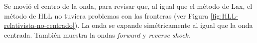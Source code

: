 \documentclass[12pt,a4paper]{book}
\begin{document}
Se movió el centro de la onda, para revisar que, al igual que el método de Lax, el método de HLL no tuviera problemas con las fronteras (ver Figura \ref{fig:HLL-relativista-no-centrado}). La onda se expande simétricamente al igual que la onda centrada. También muestra la ondas \emph{forward} y \emph{reverse shock}.

\end{document}
